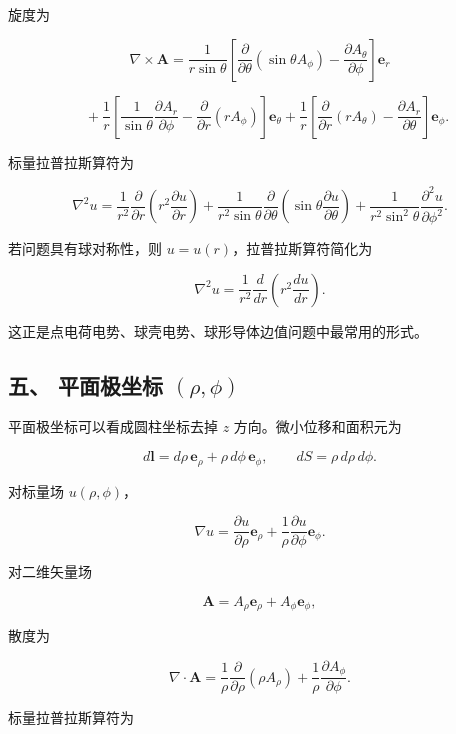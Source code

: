 旋度为

\[
\nabla\times\mathbf{A}
=
\frac{1}{r\sin\theta}
\left[
\frac{\partial}{\partial\theta}(\sin\theta A_{\phi})
-
\frac{\partial A_{\theta}}{\partial\phi}
\right]\mathbf{e}_r
\]

\[
\quad+
\frac{1}{r}
\left[
\frac{1}{\sin\theta}\frac{\partial A_r}{\partial\phi}
-
\frac{\partial}{\partial r}(rA_{\phi})
\right]\mathbf{e}_{\theta}
+
\frac{1}{r}
\left[
\frac{\partial}{\partial r}(rA_{\theta})
-
\frac{\partial A_r}{\partial\theta}
\right]\mathbf{e}_{\phi}.
\]

标量拉普拉斯算符为

\[
\nabla^2u
=
\frac{1}{r^2}\frac{\partial}{\partial r}
\left(
r^2\frac{\partial u}{\partial r}
\right)
+
\frac{1}{r^2\sin\theta}
\frac{\partial}{\partial\theta}
\left(
\sin\theta\frac{\partial u}{\partial\theta}
\right)
+
\frac{1}{r^2\sin^2\theta}
\frac{\partial^2u}{\partial\phi^2}.
\]

若问题具有球对称性，则 \(u=u(r)\)，拉普拉斯算符简化为

\[
\nabla^2u
=
\frac{1}{r^2}\frac{d}{dr}
\left(
r^2\frac{du}{dr}
\right).
\]

这正是点电荷电势、球壳电势、球形导体边值问题中最常用的形式。

\subsection{\texorpdfstring{五、 平面极坐标
\((\rho,\phi)\)}{五、 平面极坐标 (\textbackslash rho,\textbackslash phi)}}\label{m1:ux4e94-ux5e73ux9762ux6781ux5750ux6807-rhophi}

平面极坐标可以看成圆柱坐标去掉 \(z\) 方向。微小位移和面积元为

\[
d\mathbf{l}
=
d\rho\,\mathbf{e}_{\rho}
+
\rho\,d\phi\,\mathbf{e}_{\phi},
\qquad
dS=\rho\,d\rho\,d\phi.
\]

对标量场 \(u(\rho,\phi)\)，

\[
\nabla u
=
\frac{\partial u}{\partial\rho}\mathbf{e}_{\rho}
+
\frac{1}{\rho}\frac{\partial u}{\partial\phi}\mathbf{e}_{\phi}.
\]

对二维矢量场

\[
\mathbf{A}=A_{\rho}\mathbf{e}_{\rho}+A_{\phi}\mathbf{e}_{\phi},
\]

散度为

\[
\nabla\cdot\mathbf{A}
=
\frac{1}{\rho}\frac{\partial}{\partial\rho}(\rho A_{\rho})
+
\frac{1}{\rho}\frac{\partial A_{\phi}}{\partial\phi}.
\]

标量拉普拉斯算符为

